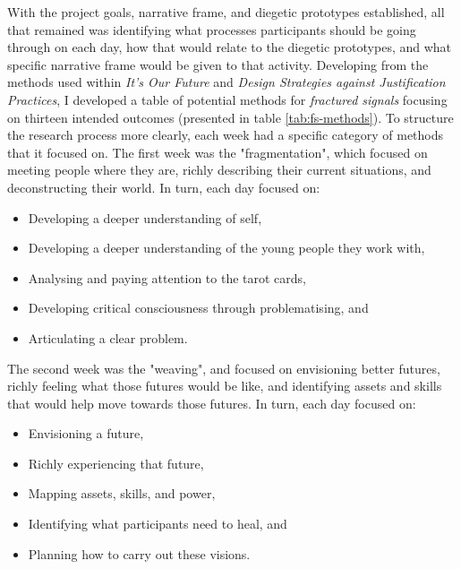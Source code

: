 With the project goals, narrative frame, and diegetic prototypes established, all that remained was identifying what processes participants should be going through on each day, how that would relate to the diegetic prototypes, and what specific narrative frame would be given to that activity. Developing from the methods used within \textit{It’s Our Future} and \textit{Design Strategies against Justification Practices}, I developed a table of potential methods for \textit{fractured signals} focusing on thirteen intended outcomes (presented in table \ref{tab:fs-methods}). To structure the research process more clearly, each week had a specific category of methods that it focused on. The first week was the "fragmentation", which focused on meeting people where they are, richly describing their current situations, and deconstructing their world. In turn, each day focused on:
\begin{itemize}
    \item Developing a deeper understanding of self,
    \item Developing a deeper understanding of the young people they work with,
    \item Analysing and paying attention to the tarot cards,
    \item Developing critical consciousness through problematising, and
    \item Articulating a clear problem.
\end{itemize}
The second week was the "weaving", and focused on envisioning better futures, richly feeling what those futures would be like, and identifying assets and skills that would help move towards those futures. In turn, each day focused on:
\begin{itemize}
    \item Envisioning a future,
    \item Richly experiencing that future,
    \item Mapping assets, skills, and power,
    \item Identifying what participants need to heal, and
    \item Planning how to carry out these visions.
\end{itemize}

